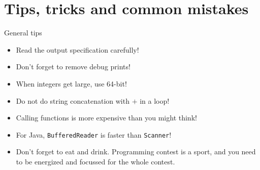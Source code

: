 \documentclass[11pt,pdf, aspectratio=169]{beamer}
\begin{document}
  \section{Tips, tricks and common mistakes}
  \begin{frame}{General tips}
    \begin{itemize}
      \item Read the output specification carefully!
      \item Don't forget to remove debug prints!
      \item When integers get large, use 64-bit!
      \item Do not do string concatenation with $+$ in a loop!
      \item Calling functions is more expensive than you might think!
      \item For Java, \texttt{BufferedReader} is faster than \texttt{Scanner}!
      \item Don't forget to eat and drink.
      Programming contest is a sport, and you need to be energized and focussed for the whole contest.
    \end{itemize}
  \end{frame}
\end{document}

